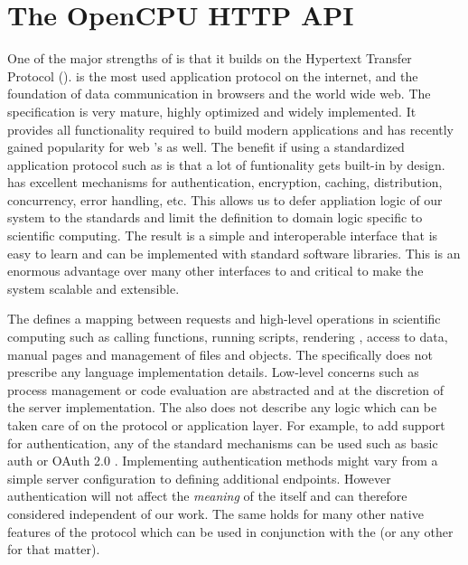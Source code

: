 \section{The OpenCPU HTTP API}

One of the major strengths of \OpenCPU is that it builds on the Hypertext Transfer Protocol (\HTTP). \HTTP is the most used application protocol on the internet, and the foundation of data communication in browsers and the world wide web. The \HTTP specification is very mature, highly optimized and widely implemented. It provides all functionality required to build modern applications and has recently gained popularity for web \API's as well. The benefit if using a standardized application protocol such as \HTTP is that a lot of funtionality gets built-in by design. \HTTP has excellent mechanisms for authentication, encryption, caching, distribution, concurrency, error handling, etc. This allows us to defer appliation logic of our system to the \HTTP standards and limit the \OpenCPU \API definition to domain logic specific to scientific computing. The result is a simple and interoperable interface that is easy to learn and can be implemented with standard \HTTP software libraries. This is an enormous advantage over many other interfaces to \R and critical to make the system scalable and extensible. 

The \OpenCPU \API defines a mapping between \HTTP requests and high-level operations in scientific computing such as calling functions, running scripts, rendering \Latex, access to data, manual pages and management of files and objects. The \API specifically does not prescribe any language implementation details. Low-level concerns such as process management or code evaluation are abstracted and at the discretion of the server implementation. The \API also does not describe any logic which can be taken care of on the protocol or application layer. For example, to add support for authentication, any of the standard mechanisms can be used such as \HTTP basic auth \citep{franks1999rfc} or OAuth 2.0 \citep{hardt2012oauth}. Implementing authentication methods might vary from a simple server configuration to defining additional endpoints. However authentication will not affect the \emph{meaning} of the \API itself and can therefore considered independent of our work. The same holds for many other native features of the \HTTP protocol which can be used in conjunction with the \OpenCPU \API (or any other \HTTP \API for that matter). 

